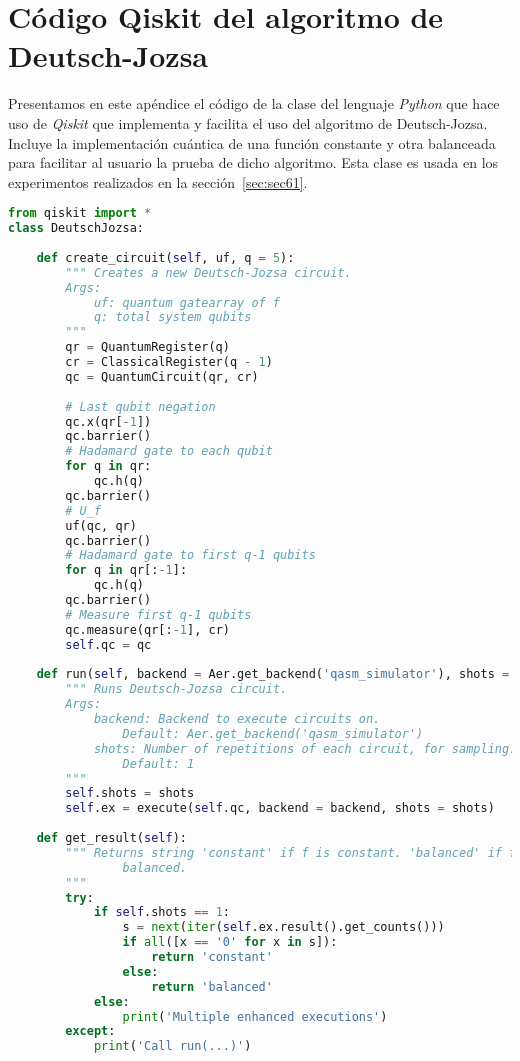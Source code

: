 \chapter{Código Qiskit del algoritmo de Deutsch-Jozsa}
\label{ap:ap1}

Presentamos en este apéndice el código de la clase del lenguaje \textit{Python} que hace uso de \textit{Qiskit} que implementa y facilita el uso del algoritmo de Deutsch-Jozsa. Incluye la implementación cuántica de una función constante y otra balanceada para facilitar al usuario la prueba de dicho algoritmo. Esta clase es usada en los experimentos realizados en la sección~\ref{sec:sec61}.

\begin{lstlisting}[language=Python]
from qiskit import *
class DeutschJozsa:
        
    def create_circuit(self, uf, q = 5):
        """ Creates a new Deutsch-Jozsa circuit.
        Args:
            uf: quantum gatearray of f
            q: total system qubits
        """
        qr = QuantumRegister(q)
        cr = ClassicalRegister(q - 1)
        qc = QuantumCircuit(qr, cr)
        
        # Last qubit negation
        qc.x(qr[-1])
        qc.barrier()
        # Hadamard gate to each qubit
        for q in qr:
            qc.h(q)
        qc.barrier()
        # U_f
        uf(qc, qr)
        qc.barrier()
        # Hadamard gate to first q-1 qubits
        for q in qr[:-1]:
            qc.h(q)
        qc.barrier()  
        # Measure first q-1 qubits
        qc.measure(qr[:-1], cr)
        self.qc = qc
    
    def run(self, backend = Aer.get_backend('qasm_simulator'), shots = 1):
        """ Runs Deutsch-Jozsa circuit.
        Args:
            backend: Backend to execute circuits on.
                Default: Aer.get_backend('qasm_simulator')
            shots: Number of repetitions of each circuit, for sampling.
                Default: 1
        """
        self.shots = shots
        self.ex = execute(self.qc, backend = backend, shots = shots)
    
    def get_result(self):
        """ Returns string 'constant' if f is constant. 'balanced' if f is
                balanced.
        """
        try:
            if self.shots == 1:
                s = next(iter(self.ex.result().get_counts()))
                if all([x == '0' for x in s]):
                    return 'constant'
                else:
                    return 'balanced'
            else:
                print('Multiple enhanced executions')
        except:
            print('Call run(...)')
                

\end{lstlisting}
